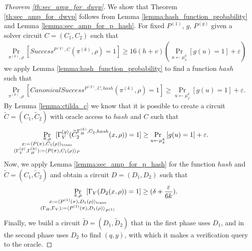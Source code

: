 %
\begin{proof}[Theorem \ref{th:sec_amp_for_dwvp}]
We show that Theorem \ref{th:sec_amp_for_dwvp} follows from Lemma \ref{lemma:hash_function_probability} and Lemma \ref{lemma:sec_amp_for_p_hash}.
For fixed $P^{(1)}$, $g$, $P^{(g)}$ given a solver circuit $C = (C_1, C_2)$ such that
\begin{align*}
    \underset{\pi^{(k)}, \rho}{\Pr}\left[Success^{P^{(g)}, C}(\pi^{(k)}, \rho) = 1\right] \geq 16(h+v)\left(\underset{u \leftarrow \mu_\delta^k}{\Pr}\left[g(u) = 1\right] + \varepsilon\right)
\end{align*}
we apply Lemma \ref{lemma:hash_function_probability} to find a function $hash$ such that
\begin{align*}
    \underset{\pi^{(k)}, \rho}{\Pr}\left[CanonicalSuccess^{P^{(g)}, C, hash}(\pi^{(k)}, \rho) = 1\right] \geq \underset{u \leftarrow \mu_\delta^k}{\Pr}\left[g(u) = 1\right] + \varepsilon.
\end{align*}
By Lemma \ref{lemma:ctilda_c} we know that it is possible to create a circuit $\widetilde{C} = (C_1, \widetilde{C}_2)$ with oracle access to $hash$ and $C$ such that
\begin{align*}
    \underset{
      \mathclap {
      \substack{\pi, \rho \\
        x := \langle P(\pi), C_1(\rho) \rangle_{\text{trans}} \\
        (\Gamma_V^{(g)}, \Gamma_H^{(k)}) := \langle P(\pi), C_1(\rho) \rangle_{P}
      }}}
    {\Pr}\mkern13mu[\Gamma_V^{(g)}(\widetilde{C}_2^{\Gamma_H^{(k)}, C_2, hash}(x, \rho)) = 1]
    \geq
\underset{u \leftarrow \mu_\delta^k}{\Pr}\left[g(u) = 1\right] + \varepsilon.
\end{align*}
Now, we apply Lemma \ref{lemma:sec_amp_for_p_hash} for the function $hash$ and $\widetilde{C} = (C_1, \widetilde{C}_2)$ and obtain a circuit $D = (D_1, D_2)$ such that
\begin{align}
  \label{eq:succ_prob_d}
    \underset{
      \mathclap{
      \substack{\pi, \rho \\ x := \langle P^{(1)}(\pi), D_1(\rho) \rangle_{\text{trans}} \\
        (\Gamma_H, \Gamma_V) := \langle P^{(1)}(\pi), D_1(\rho) \rangle_{P^{(1)}}}}}
    {\Pr}\mkern13mu[\Gamma_V(D_2(x, \rho)) = 1] \geq (\delta + \frac{\varepsilon}{6k}).
\end{align}
Finally, we build a circuit $\widetilde{D} = (D_1, \widetilde{D}_2)$ that in the first phase uses $D_1$, and in the second phase
uses $D_2$ to find $(q,y)$, with which it makes a verification query to the oracle.

\end{proof}
